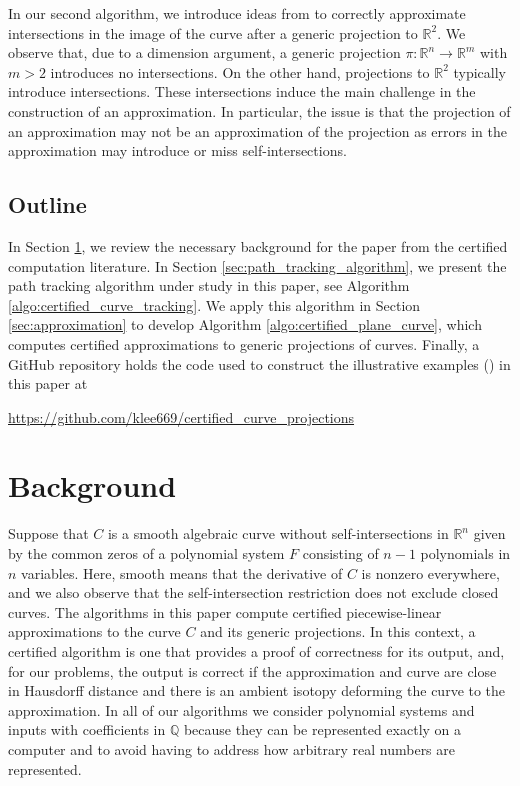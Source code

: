 In our second algorithm, we introduce ideas from \cite{Byrd:2023} to correctly approximate intersections in the image of the curve after a generic projection to $\mathbb{R}^2$.  We observe that, due to a dimension argument, a generic projection $\pi:\mathbb{R}^n\rightarrow\mathbb{R}^m$ with $m>2$ introduces no intersections.  On the other hand, projections to $\mathbb{R}^2$ typically introduce intersections.  These intersections induce the main challenge in the construction of an approximation.  In particular, the issue is that the projection of an approximation may not be an approximation of the projection as errors in the approximation may introduce or miss self-intersections.

\subsection*{Outline}

In Section \ref{sec:background}, we review the necessary background for the paper from the certified computation literature.  In Section \ref{sec:path_tracking_algorithm}, we present the path tracking algorithm under study in this paper, see Algorithm \ref{algo:certified_curve_tracking}.  We apply this algorithm in Section \ref{sec:approximation} to develop Algorithm \ref{algo:certified_plane_curve}, which computes certified approximations to generic projections of curves.  Finally, a GitHub repository holds the code used to construct the illustrative examples () in this paper at

\centerline{\url{https://github.com/klee669/certified_curve_projections}}

\section{Background}\label{sec:background}
Suppose that $C$ is a smooth algebraic curve without self-intersections in $\mathbb{R}^n$ given by the common zeros of a polynomial system $F$ consisting of $n-1$ polynomials in $n$ variables.  Here, smooth means that the derivative of $C$ is nonzero everywhere, and we also observe that the self-intersection restriction does not exclude closed curves.  The algorithms in this paper compute certified piecewise-linear approximations to the curve $C$ and its generic projections.  In this context, a certified algorithm is one that provides a proof of correctness for its output, and, for our problems, the output is correct if the approximation and curve are close in Hausdorff distance and there is an ambient isotopy deforming the curve to the approximation.  In all of our algorithms we consider polynomial systems and inputs with coefficients in $\mathbb{Q}$ because they can be represented exactly on a computer and to avoid having to address how arbitrary real numbers are represented.

